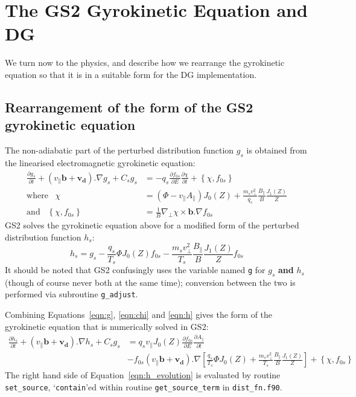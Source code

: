 \documentclass[10pt,a4paper]{article}
\newcommand{\dd}{\partial}
\begin{document}
\section{The GS2 Gyrokinetic Equation and DG}
\label{sec:gkeqn_rearrangment}

We turn now to the physics, and describe how we rearrange the gyrokinetic
equation so that it is in a suitable form for the DG implementation.

\subsection{Rearrangement of the form of the GS2 gyrokinetic equation}

The non-adiabatic part of the perturbed distribution function $g_s$ is obtained
from the linearised electromagnetic gyrokinetic equation:
\begin{align}
  \frac{\dd g_s}{\dd t} + (v_\parallel \mathbf{b} + \mathbf{v_d}).\nabla g_s +
  C_s g_s & = -q_s \frac{\dd f_{0s}}{\dd E} \frac{\dd \chi}{\dd t} + 
  \left\{ \chi, f_{0s}\right\} \label{eqn:g}\\
  \mbox{where} \;\;\; \chi & = \left(\Phi - v_\parallel A_\parallel \right)
  J_0(Z) + \frac{m_s v_\perp^2}{q_s} \frac{B_\parallel}{B}
  \frac{J_1(Z)}{Z} \label{eqn:chi} \\
  \mbox{and} \;\;\; \left\{ \chi, f_{0s}\right\} & = \frac{1}{B} \nabla_\perp
  \chi \times \mathbf{b}.\nabla f_{0s}
\end{align}
GS2 solves the gyrokinetic equation above for a modified form of the perturbed
distribution function $h_s$:
\begin{equation}
  h_s = g_s - \frac{q_s}{T_s} \Phi J_0(Z) f_{0s} - \frac{m_s v_\perp^2}{T_s}
  \frac{B_\parallel}{B} \frac{J_1(Z)}{Z} f_{0s}
\label{eqn:h}
\end{equation}
It should be noted that GS2 confusingly uses the variable named \texttt{g} for
$g_s$ \textbf{and}\/ $h_s$ (though of course never both at the same time);
conversion between the two is performed via subroutine \texttt{g\_adjust}.

Combining Equations~\ref{eqn:g}, \ref{eqn:chi} and \ref{eqn:h} gives the form of the
gyrokinetic equation that is numerically solved in GS2:
\begin{align}
  \frac{\dd h_s}{\dd t} + (v_\parallel \mathbf{b} + \mathbf{v_d}).\nabla h_s +
  C_s g_s & = q_s v_\parallel J_0(Z) \frac{\dd f_{0s}}{\dd E} \frac{\dd
    A_\parallel}{\dd t} \nonumber \\
  {}& - f_{0s}(v_\parallel \mathbf{b} + \mathbf{v_d}).\nabla 
  \left[ \frac{q_s}{T_s} \Phi J_0(Z) +\frac{m_s v_\perp^2}{T_s}
    \frac{B_\parallel}{B} \frac{J_1(Z)}{Z} \right] + \left\{ \chi,
    f_{0s}\right\} 
  \label{eqn:h_evolution}
\end{align}
The right hand side of Equation~\ref{eqn:h_evolution} is evaluated by routine
\texttt{set\_source}, `\texttt{contain}'ed within routine \texttt{get\_source\_term} in
\texttt{dist\_fn.f90}.
\end{document}
